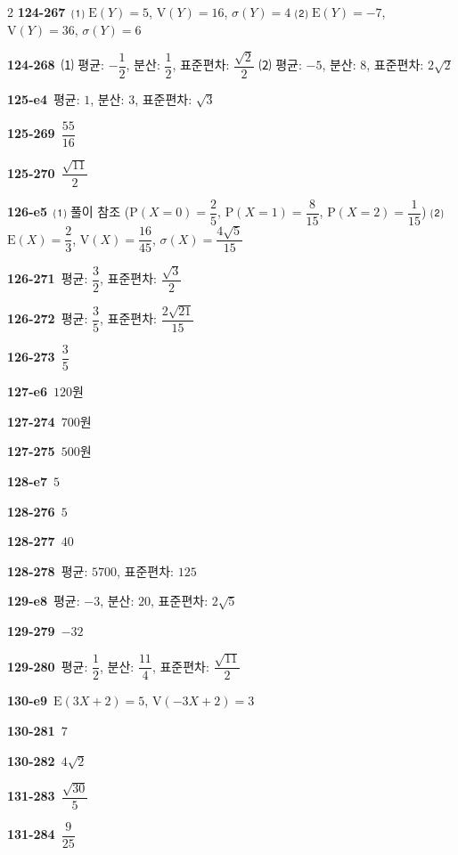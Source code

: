 \documentclass[10pt,a4paper]{article}
\begin{document}
\begin{multicols}{2}
\noindent\textbf{124-267}\ ⑴ $\mathrm{E}(Y)=5$, $\mathrm{V}(Y)=16$, $\sigma(Y)=4$ ⑵ $\mathrm{E}(Y)=-7$, $\mathrm{V}(Y)=36$, $\sigma(Y)=6$\par
\noindent\textbf{124-268}\ ⑴ 평균: $-\dfrac{1}{2}$, 분산: $\dfrac{1}{2}$, 표준편차: $\dfrac{\sqrt{2}}{2}$ ⑵ 평균: $-5$, 분산: $8$, 표준편차: $2\sqrt{2}$\par
\noindent\textbf{125-e4}\ 평균: $1$, 분산: $3$, 표준편차: $\sqrt{3}$\par
\noindent\textbf{125-269}\ $\dfrac{55}{16}$\par
\noindent\textbf{125-270}\ $\dfrac{\sqrt{11}}{2}$\par
\noindent\textbf{126-e5}\ ⑴ 풀이 참조 ($\mathrm{P}(X=0)=\dfrac{2}{5}$, $\mathrm{P}(X=1)=\dfrac{8}{15}$, $\mathrm{P}(X=2)=\dfrac{1}{15}$) ⑵ $\mathrm{E}(X)=\dfrac{2}{3}$, $\mathrm{V}(X)=\dfrac{16}{45}$, $\sigma(X)=\dfrac{4\sqrt{5}}{15}$\par
\noindent\textbf{126-271}\ 평균: $\dfrac{3}{2}$, 표준편차: $\dfrac{\sqrt{3}}{2}$\par
\noindent\textbf{126-272}\ 평균: $\dfrac{3}{5}$, 표준편차: $\dfrac{2\sqrt{21}}{15}$\par
\noindent\textbf{126-273}\ $\dfrac{3}{5}$\par
\noindent\textbf{127-e6}\ $120$원\par
\noindent\textbf{127-274}\ $700$원\par
\noindent\textbf{127-275}\ $500$원\par
\noindent\textbf{128-e7}\ $5$\par
\noindent\textbf{128-276}\ $5$\par
\noindent\textbf{128-277}\ $40$\par
\noindent\textbf{128-278}\ 평균: $5700$, 표준편차: $125$\par
\noindent\textbf{129-e8}\ 평균: $-3$, 분산: $20$, 표준편차: $2\sqrt{5}$\par
\noindent\textbf{129-279}\ $-32$\par
\noindent\textbf{129-280}\ 평균: $\dfrac{1}{2}$, 분산: $\dfrac{11}{4}$, 표준편차: $\dfrac{\sqrt{11}}{2}$\par
\noindent\textbf{130-e9}\ $\mathrm{E}(3X+2)=5$, $\mathrm{V}(-3X+2)=3$\par
\noindent\textbf{130-281}\ $7$\par
\noindent\textbf{130-282}\ $4\sqrt{2}$\par
\noindent\textbf{131-283}\ $\dfrac{\sqrt{30}}{5}$\par
\noindent\textbf{131-284}\ $\dfrac{9}{25}$\par

\end{multicols}
\end{document}
